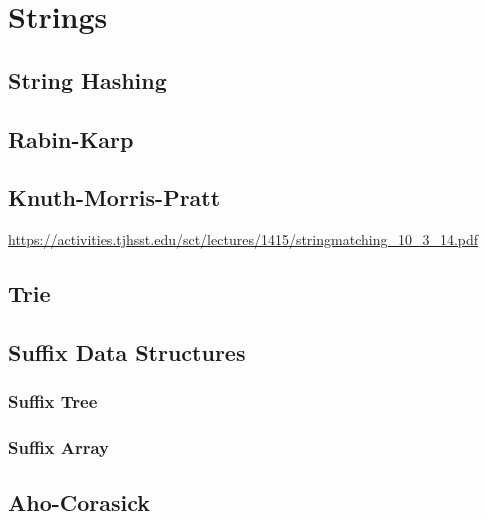 \chapter{Strings}

\section{String Hashing}

\section{Rabin-Karp}

\section{Knuth-Morris-Pratt}

\url{https://activities.tjhsst.edu/sct/lectures/1415/stringmatching_10_3_14.pdf}

\section{Trie}

\section{Suffix Data Structures}

\subsection{Suffix Tree}

\subsection{Suffix Array}

\section{Aho-Corasick}


